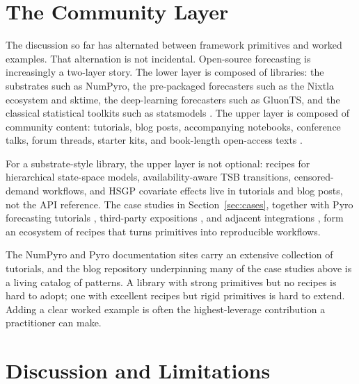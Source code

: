 \documentclass[11pt,3p,review,authoryear]{elsarticle}
\begin{document}
\section{The Community Layer}
\label{sec:community}

The discussion so far has alternated between framework primitives and worked examples. That alternation is not incidental. Open-source forecasting is increasingly a two-layer story. The lower layer is composed of libraries: the substrates such as NumPyro, the pre-packaged forecasters such as the Nixtla ecosystem and sktime, the deep-learning forecasters such as GluonTS, and the classical statistical toolkits such as statsmodels \citep{nixtla2024, loning2019sktime, alexandrov2020gluonts, statsmodels}. The upper layer is composed of community content: tutorials, blog posts, accompanying notebooks, conference talks, forum threads, starter kits, and book-length open-access texts \citep{hyndman2021forecasting, svetunkov2023adam}.

For a substrate-style library, the upper layer is not optional: recipes for hierarchical state-space models, availability-aware TSB transitions, censored-demand workflows, and HSGP covariate effects live in tutorials and blog posts, not the API reference. The case studies in Section~\ref{sec:cases}, together with Pyro forecasting tutorials \citep{pyro_dlm_tutorial, pyro_m5_starter}, third-party expositions \citep{caron_censored, svetunkov_zeros}, and adjacent integrations \citep{pymc_marketing_lift, orduz_pymc_labs}, form an ecosystem of recipes that turns primitives into reproducible workflows.

The NumPyro and Pyro documentation sites carry an extensive collection of tutorials, and the blog repository underpinning many of the case studies above \citep{orduz_pymc_labs} is a living catalog of patterns. A library with strong primitives but no recipes is hard to adopt; one with excellent recipes but rigid primitives is hard to extend. Adding a clear worked example is often the highest-leverage contribution a practitioner can make.


\section{Discussion and Limitations}
\label{sec:discussion}
\end{document}
